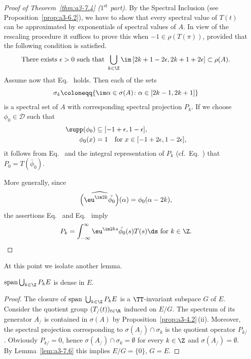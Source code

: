 \begin{proof}[Proof of Theorem~\ref{thm:a3-7.4} ($1^{\text{st}} $ part)]
By the Spectral Inclusion (see Proposition~\ref{prop:a3-6.2}), we have to show that every spectral value of\/ $T(t)$ can be approximated by exponentials of spectral values of\/ $A$.
In view of the rescaling procedure it suffices to prove this when $-1 \in \rho(T(\pi))$, provided that the following condition is satisfied.
\begin{equation}\label{eq:a3-7.4}
	\text{There exists } \epsilon > 0 \text{ such that } \bigcup_{k\in\Z} \im\,[2k+1-2\epsilon,2k+1+2\epsilon] \subset 	\rho(A) .
\end{equation}
Assume now that Eq.~ holds.
Then each of the sets 
\[
	\sigma_{k}\coloneqq \{\im\alpha \in \sigma(A) \colon \alpha \in [2k-1,2k+1]\}
\] 
is a spectral set of\/ $A$ with corresponding spectral projection $P_{k}$.
If we choose $\phi_{0} \in \mathcal{D}$ such that 
\begin{align*}
	\supp(\phi_{0}) &\subseteq [-1+\epsilon,1-\epsilon], \\
	\phi_{0}(x) & = 1 \quad \text{for $x \in [-1 + 2\epsilon,1 - 2\epsilon]$}, 
\end{align*}
it follows from Eq.~ and the integral representation of\/ $P_{k}$ (cf.\ Eq.~) that $P_{0} = T(\check{\phi_{0}})$.

More generally, since %
\[
	\widehat{\left(\eu^{\im 2k}\check{\phi_{0}}\right)}(\alpha) = \phi_{0}(\alpha-2k) ,
\]
%
the assertions Eq.~ and Eq.~ imply
\begin{equation}\label{eq:a3-7.5}
P_{k} = \int_{-\infty}^{\infty} \eu^{\im 2ks}\check{\phi_{0}}(s)T(s)\ds \text{ for } k \in \Z .
\qedhere
\end{equation}
\end{proof}
At this point we isolate another lemma.
\begin{lemma}\label{lem:a3-7.7}
$\mathrm{span }\bigcup_{k\in\Z} P_{k}E$ is dense in $E$.
\end{lemma}
\begin{proof}
The closure of\/ $\text{span }\bigcup_{k\in\Z} P_{k}E$ is a $\TT$-invariant subspace $G$ of\/ $E$.
Consider the quotient group $(T_/(t))_{t\in\R}$ induced on $E/G$.
The spectrum of its generator $A_{/}$ is contained in $\sigma(A)$ by Proposition~\ref{prop:a3-4.2}\,(ii).
Moreover, the spectral projection corresponding to $\sigma(A_{/}) \cap \sigma_{k}$ is the quotient operator $P_{k/}$.
Obviously $P_{k/} = 0$, hence $\sigma(A_{/}) \cap \sigma_{k} = \emptyset$ for every $k \in \Z$ and $\sigma(A_{/}) = \emptyset$.
By Lemma~\ref{lem:a3-7.6} this implies $E/G = \{0\}$, \ie $G = E$.
\end{proof}
